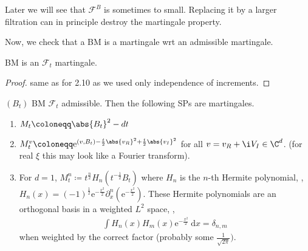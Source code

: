 Later we will see that $\mathcal{F}^B$ is sometimes to small.
Replacing it by a larger filtration can in principle destroy the martingale property.

\begin{defi}

\end{defi}

Now, we check that a BM is a martingale wrt an admissible martingale.
\begin{prop}
BM is an $\mathcal{F}_t$ martingale.
\end{prop}
\begin{proof}
same as for 2.10 as we used only independence of increments.
\end{proof}

\begin{prop}
$(B_t)$ BM $\mathcal{F}_t$ admissible.
Then the following SPs are martingales.
\begin{enumerate}[label=\roman*)]
\item $M_t\coloneqq \abs{B_t}^2-dt$
\item $M_t^v \coloneqq \mathrm{e}^{(v,B_t)-\frac{t}{2}\abs{v_R}^2+\frac{t}{2}\abs{v_I}^2}$ for all $v=v_R+\i V_I \in \C^d$. (for real $\xi$ this may look like a Fourier transform).
\item For $d=1$, $M_t^n \coloneqq t^{\frac{n}{2}} H_n(t^{-\frac{1}{2}}B_t)$ where $H_n$ is the $n$-th Hermite polynomial, \ie ,
$H_n(x)=(-1)^{\frac{1}{2}} \mathrm{e}^{-\frac{x^2}{2}} \partial_x^n(\mathrm{e}^{-\frac{x^2}{2}})$.
These Hermite polynomials are an orthogonal basis in a weighted $\mathit{L}^2$ space, \ie ,
\begin{align*}
\int H_n(x)H_m(x) \mathrm{e}^{-\frac{x^2}{2}}~\mathrm{d}x=\delta_{n,m}
\end{align*}
when weighted by the correct factor (probably some $\frac{1}{\sqrt{2\pi}})$.
\end{enumerate}
\end{prop}

